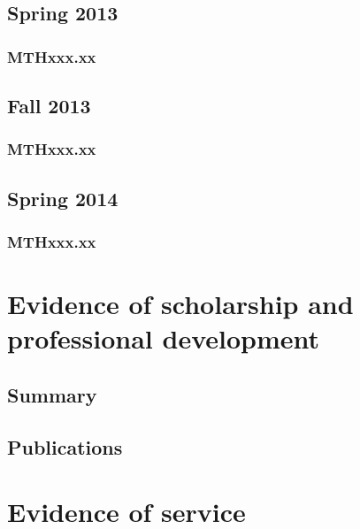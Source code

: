 \documentclass[ openright,titlepage,numbers=noenddot,headinclude,%
                footinclude=true,cleardoublepage=empty,abstractoff, 
                BCOR=5mm,paper=letter,fontsize=11pt,%
                ngerman, american, %
                ]{scrreprt}
\begin{document}
\subsection{Spring 2013}
\subsubsection{MTHxxx.xx}




\subsection{Fall 2013}
\subsubsection{MTHxxx.xx}



\subsection{Spring 2014}
\subsubsection{MTHxxx.xx}




\section{Evidence of scholarship and professional development}
\subsection{Summary}

\subsection{Publications}


\section{Evidence of service}

\end{document}
